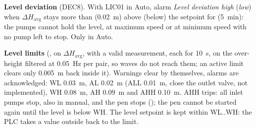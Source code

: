 \documentclass[11pt,a4paper]{article}
\begin{document}
\textbf{Level deviation} (DEC8). With LIC01 in Auto, alarm \emph{Level deviation high} (\emph{low}) when
$\Delta H_\text{avg}$ stays more than  (0.02~m) above (below) the setpoint for
 (5~min): the pumps cannot hold the level, at maximum speed or at minimum
speed with no pump left to stop. Only in Auto.

\textbf{Level limits} (, on $\Delta H_\text{avg}$, with a valid measurement, each for
 10~s, on the over-height filtered at 0.05~Hz per pair, so waves do not reach
them; an active limit clears only  0.005~m back inside it). Warnings clear by
themselves, alarms are acknowledged:
WL 0.03~m, AL 0.02~m (ALL 0.01~m, close the outlet valve, not implemented), WH 0.08~m, AH 0.09~m and
AHH 0.10~m. AHH trips: all inlet pumps stop, also in manual, and the pen stops
(); the pen cannot be started again until the level is below WH. The level
setpoint is kept within WL..WH: the PLC takes a value outside back to the limit.
\end{document}
